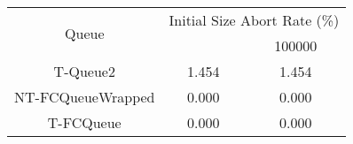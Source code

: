 \begin{tabular}{|c|c|c|}
\hline
\multirow{2}{*}{Queue} & \multicolumn{2}{c|}{Initial Size Abort Rate (\%)}\\\cline{2-3}& \qquad 10000 \qquad\quad & 100000\\
\hline
\hline
T-Queue2 & 1.454 & 1.454\\
NT-FCQueueWrapped & 0.000 & 0.000\\
T-FCQueue & 0.000 & 0.000\\
\hline\end{tabular}
